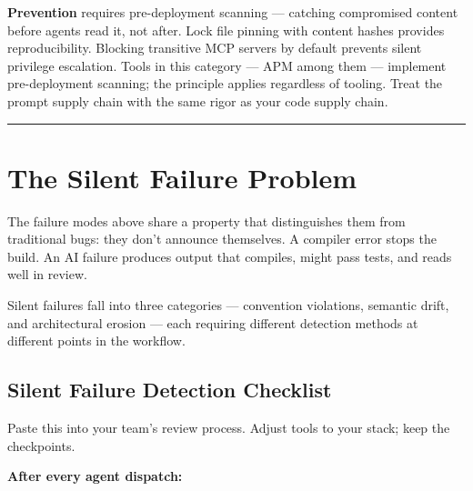 \documentclass[
  a4paper,
  DIV=11,
  numbers=noendperiod]{scrreprt}
\begin{document}
\textbf{Prevention} requires pre-deployment scanning --- catching
compromised content before agents read it, not after. Lock file pinning
with content hashes provides reproducibility. Blocking transitive MCP
servers by default prevents silent privilege escalation. Tools in this
category --- APM among them --- implement pre-deployment scanning; the
principle applies regardless of tooling. Treat the prompt supply chain
with the same rigor as your code supply chain.

\begin{center}\rule{0.5\linewidth}{0.5pt}\end{center}

\section{The Silent Failure Problem}\label{the-silent-failure-problem}

The failure modes above share a property that distinguishes them from
traditional bugs: they don't announce themselves. A compiler error stops
the build. An AI failure produces output that compiles, might pass
tests, and reads well in review.

Silent failures fall into three categories --- convention violations,
semantic drift, and architectural erosion --- each requiring different
detection methods at different points in the workflow.

\subsection{Silent Failure Detection
Checklist}\label{silent-failure-detection-checklist}

Paste this into your team's review process. Adjust tools to your stack;
keep the checkpoints.

\textbf{After every agent dispatch:}
\end{document}
